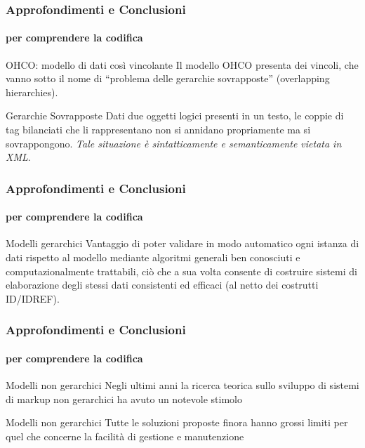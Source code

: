 \begin{frame}
	\frametitle{Approfondimenti e Conclusioni}
	\framesubtitle{per comprendere la codifica}
	\addtocounter{nframe}{1}

	\begin{block}{OHCO: modello di dati così vincolante}
		Il modello OHCO presenta dei vincoli, che vanno sotto il nome di ``problema delle gerarchie sovrapposte'' (overlapping hierarchies).
	 \end{block}
	 
	 \begin{block}{Gerarchie Sovrapposte}
		Dati due oggetti logici presenti in un testo, le coppie di tag bilanciati che li rappresentano non si annidano propriamente ma si sovrappongono. \textit{Tale situazione è sintatticamente e semanticamente vietata in XML}.
 	\end{block}
   
\end{frame}

\begin{frame}
	\frametitle{Approfondimenti e Conclusioni}
	\framesubtitle{per comprendere la codifica}
	\addtocounter{nframe}{1}

	\begin{block}{Modelli gerarchici}
		Vantaggio di poter validare in modo automatico ogni istanza di dati rispetto al modello mediante algoritmi generali ben conosciuti e computazionalmente trattabili, ciò che a sua volta consente di costruire sistemi di elaborazione degli stessi dati consistenti ed efficaci (al netto dei costrutti ID/IDREF).
	 \end{block}
	 
   
\end{frame}

\begin{frame}
	\frametitle{Approfondimenti e Conclusioni}
	\framesubtitle{per comprendere la codifica}
	\addtocounter{nframe}{1}

	\begin{block}{Modelli non gerarchici}
		Negli ultimi anni la ricerca teorica sullo sviluppo di sistemi di markup non gerarchici ha avuto un notevole stimolo
	 \end{block}

	 \begin{block}{Modelli non gerarchici}
		Tutte le soluzioni proposte finora hanno grossi limiti per quel che concerne la facilità di gestione e manutenzione
	 \end{block}
	 
   
\end{frame}


